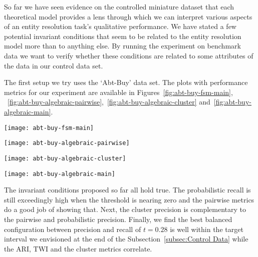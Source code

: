 So far we have seen evidence on the controlled miniature dataset that each
theoretical model provides a lens through which we can interpret various aspects
of an entity resolution task's qualitative performance.
We have stated a few potential invariant conditions that seem to be related to
the entity resolution model more than to anything else.
By running the experiment on benchmark data we want to verify whether these
conditions are related to some attributes of the data in our control data set.

The first setup we try uses the `Abt-Buy' data set.
The plots with performance metrics for our experiment are available in Figures~\ref{fig:abt-buy-fsm-main},
~\ref{fig:abt-buy-algebraic-pairwise},~\ref{fig:abt-buy-algebraic-cluster}
and~\ref{fig:abt-buy-algebraic-main}.

\begin{figure*}[htbp]
    \begin{minipage}{0.24\textwidth}
        \centering
        \texttt{[image: abt-buy-fsm-main]}
        \caption{Abt-Buy statistical metrics.}\label{fig:abt-buy-fsm-main}
    \end{minipage}
    \begin{minipage}{0.24\textwidth}
        \centering
        \texttt{[image: abt-buy-algebraic-pairwise]}
        \caption{Abt-Buy pairwise metrics.}\label{fig:abt-buy-algebraic-pairwise}
    \end{minipage}
    \begin{minipage}{0.24\textwidth}
        \centering
        \texttt{[image: abt-buy-algebraic-cluster]}
        \caption{Abt-Buy cluster metrics.}\label{fig:abt-buy-algebraic-cluster}
    \end{minipage}
    \begin{minipage}{0.24\textwidth}
        \centering
        \texttt{[image: abt-buy-algebraic-main]}
        \caption{Abt-Buy clustering indexes.}\label{fig:abt-buy-algebraic-main}
    \end{minipage}
\end{figure*}\label{abt-buy}

The invariant conditions proposed so far all hold true.
The probabilistic recall is still exceedingly high when the threshold is nearing zero and the
pairwise metrics do a good job of showing that.
Next, the cluster precision is complementary to the pairwise and probabilistic
precision.
Finally, we find the best balanced configuration between precision and recall of
$t=0.28$ is well within the target interval we envisioned at the end of the
Subsection~\ref{subsec:Control Data} while the ARI, TWI and the cluster metrics correlate.

